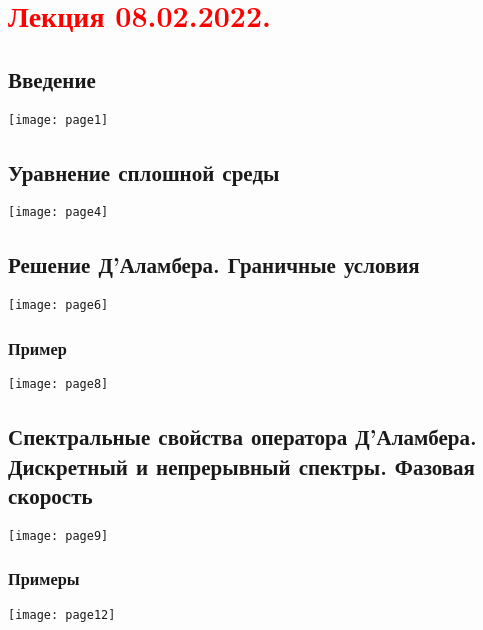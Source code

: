 \documentclass[main.tex]{subfiles}
\begin{document}
\section{\textcolor{red}{Лекция 08.02.2022.}}

\subsection{Введение}
\texttt{[image: page1]}



\subsection{Уравнение сплошной среды}

\texttt{[image: page4]}


\subsection{Решение Д'Аламбера. Граничные условия}
\texttt{[image: page6]}


\subsubsection{Пример}
\texttt{[image: page8]}

\subsection{Спектральные свойства оператора Д'Аламбера. Дискретный и непрерывный спектры. Фазовая скорость}

\texttt{[image: page9]}



\subsubsection{Примеры}
\texttt{[image: page12]}

\end{document}
